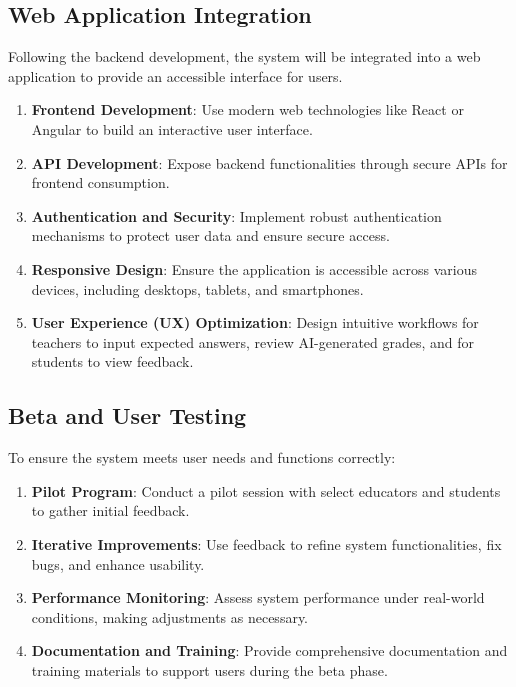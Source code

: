 \documentclass[ms,twoside,print]{nuthesis}
\begin{document}
\subsection{Web Application Integration}

Following the backend development, the system will be integrated into a web application to provide an accessible interface for users.

\begin{enumerate}
    \item \textbf{Frontend Development}: Use modern web technologies like React or Angular to build an interactive user interface.
    \item \textbf{API Development}: Expose backend functionalities through secure APIs for frontend consumption.
    \item \textbf{Authentication and Security}: Implement robust authentication mechanisms to protect user data and ensure secure access.
    \item \textbf{Responsive Design}: Ensure the application is accessible across various devices, including desktops, tablets, and smartphones.
    \item \textbf{User Experience (UX) Optimization}: Design intuitive workflows for teachers to input expected answers, review AI-generated grades, and for students to view feedback.
\end{enumerate}

\subsection{Beta and User Testing}

To ensure the system meets user needs and functions correctly:

\begin{enumerate}
    \item \textbf{Pilot Program}: Conduct a pilot session with select educators and students to gather initial feedback.
    \item \textbf{Iterative Improvements}: Use feedback to refine system functionalities, fix bugs, and enhance usability.
    \item \textbf{Performance Monitoring}: Assess system performance under real-world conditions, making adjustments as necessary.
    \item \textbf{Documentation and Training}: Provide comprehensive documentation and training materials to support users during the beta phase.
\end{enumerate}
\end{document}
